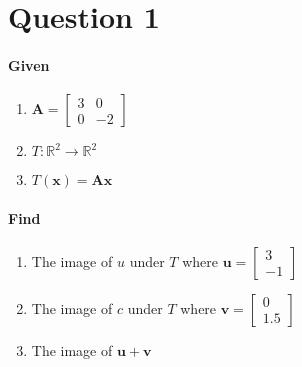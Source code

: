 \documentclass{article}
\begin{document}
\section{Question 1}
    \paragraph{Given}
        \begin{enumerate}
            \item $\mathbf{A} = \begin{bmatrix}3 & 0\\0 & -2\end{bmatrix}$
            \item $T: \mathbb{R}^2 \rightarrow \mathbb{R}^2 $ 
            \item$T(\mathbf{x})=\mathbf{A}\mathbf{x}$
        \end{enumerate}
    \paragraph{Find}
        \begin{enumerate}
            \item 
                The image of $u$ under $T$ where
                $\mathbf{u} = \begin{bmatrix}3\\-1\end{bmatrix}$
            \item 
                The image of $c$ under $T$ where
                $\mathbf{v} = \begin{bmatrix}0\\1.5\end{bmatrix}$
            \item The image of $\mathbf{u} + \mathbf{v}$
        \end{enumerate}
\end{document}

